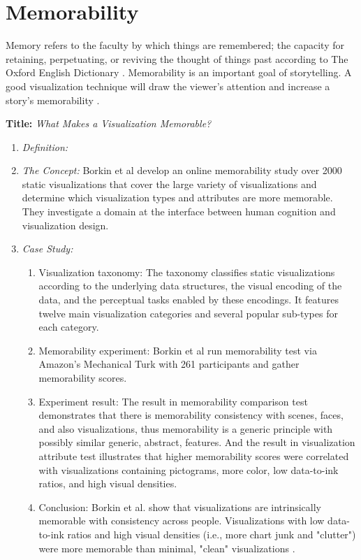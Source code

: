 \documentclass{egpubl}
\begin{document}
\section{Memorability}
Memory refers to the faculty by which things are remembered; the capacity for retaining, perpetuating, or reviving the thought of things past according to The Oxford English Dictionary \cite{memory}. Memorability is an important goal of storytelling. A good visualization technique will draw the viewer's attention and increase a story's memorability \cite{bateman}.

\textbf{Title:} \textit{What Makes a Visualization Memorable?}
\begin{enumerate}
\item \textit{Definition:} 
\item \textit{The Concept:} Borkin et al\cite{borkin2013makes} develop an online memorability study over 2000 static visualizations that cover the large variety of visualizations and determine which visualization types and attributes are more memorable. They investigate a domain at the interface between human cognition and visualization design.
\item \textit{Case Study:} 
\begin{enumerate}
\item Visualization taxonomy: The taxonomy classifies static visualizations according to the underlying data structures, the visual encoding of the data, and the perceptual tasks enabled by these encodings. It features twelve main visualization categories and several popular sub-types for each category.
\item Memorability experiment: Borkin et al run memorability test via Amazon's Mechanical Turk with 261 participants and gather memorability scores.
\item Experiment result: The result in memorability comparison test demonstrates that there is memorability consistency with scenes, faces, and also visualizations, thus memorability is a generic principle with possibly similar generic, abstract, features. And the result in visualization attribute test illustrates that higher memorability scores were correlated with visualizations containing pictograms, more color, low data-to-ink ratios, and high visual densities.
\item Conclusion: Borkin et al. show that visualizations are intrinsically memorable with consistency across people. Visualizations with low data-to-ink ratios and high visual densities (i.e., more chart junk and "clutter") were more memorable than minimal, "clean" visualizations \cite{borkin2013makes}. 

\end{enumerate}
\end{enumerate}
\end{document}
